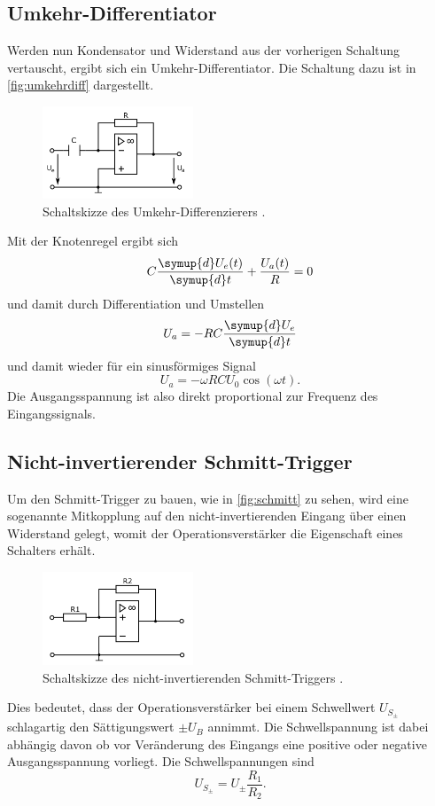 \subsection{Umkehr-Differentiator}
Werden nun Kondensator und Widerstand aus der vorherigen Schaltung vertauscht, ergibt sich 
ein Umkehr-Differentiator. Die Schaltung dazu ist in \autoref{fig:umkehrdiff}
dargestellt.
\begin{figure}[H]
    \centering
    \includegraphics[width=0.4\textwidth]{diff.png}
    \caption{Schaltskizze des Umkehr-Differenzierers \cite{anleitung}.}
    \label{fig:umkehrdiff}
\end{figure}
Mit der Knotenregel ergibt sich
\begin{equation*}
    C \frac{\symup{d} U_e(t)}{\symup{d} t} + \frac{U_a(t)}{R} = 0
\end{equation*}
und damit durch Differentiation und Umstellen
\begin{equation*}
    U_a = - R C \frac{\symup{d}U_e}{\symup{d} t}
\end{equation*}
und damit wieder für ein sinusförmiges Signal 
\begin{equation*}
    U_a = - \omega R C U_0 \cos(\omega t).
\end{equation*}
Die Ausgangsspannung ist also direkt proportional zur Frequenz des Eingangssignals.

\subsection{Nicht-invertierender Schmitt-Trigger}
Um den Schmitt-Trigger zu bauen, wie in \autoref{fig:schmitt} zu sehen, wird eine sogenannte
Mitkopplung auf den nicht-invertierenden Eingang über einen Widerstand gelegt, womit der
Operationsverstärker die Eigenschaft eines Schalters erhält.
\begin{figure}[H]
    \centering
    \includegraphics[width=0.4\textwidth]{schmitt.png}
    \caption{Schaltskizze des nicht-invertierenden Schmitt-Triggers \cite{anleitung}.}
    \label{fig:schmitt}
\end{figure}
Dies bedeutet, dass der Operationsverstärker
bei einem Schwellwert $U_{S_{\pm}}$ schlagartig den Sättigungswert $\pm U_B$ annimmt.
Die Schwellspannung ist dabei abhängig davon ob vor Veränderung des Eingangs eine 
positive oder negative Ausgangsspannung vorliegt. 
Die Schwellspannungen sind 
\begin{equation*}
    U_{S_{\pm}} = U_{\pm} \frac{R_1}{R_2}.
\end{equation*}

